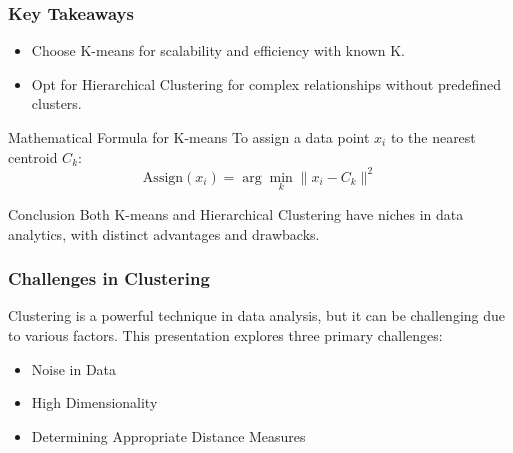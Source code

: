 \documentclass[aspectratio=169]{beamer}
\begin{document}
\begin{frame}[fragile]
    \frametitle{Key Takeaways}
    \begin{itemize}
        \item Choose K-means for scalability and efficiency with known K.
        \item Opt for Hierarchical Clustering for complex relationships without predefined clusters.
    \end{itemize}

    \begin{block}{Mathematical Formula for K-means}
        To assign a data point \( x_i \) to the nearest centroid \( C_k \):
        \begin{equation}
            \text{Assign}(x_i) = \arg \min_{k} \|x_i - C_k\|^2
        \end{equation}
    \end{block}

    \begin{block}{Conclusion}
        Both K-means and Hierarchical Clustering have niches in data analytics, with distinct advantages and drawbacks.
    \end{block}
\end{frame}

\begin{frame}[fragile]
    \frametitle{Challenges in Clustering}
    Clustering is a powerful technique in data analysis, but it can be challenging due to various factors. This presentation explores three primary challenges:
    \begin{itemize}
        \item Noise in Data
        \item High Dimensionality
        \item Determining Appropriate Distance Measures
    \end{itemize}
\end{frame}
\end{document}
